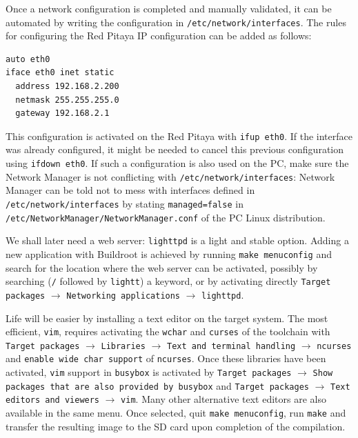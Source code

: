 \documentclass{article}
\begin{document}
{\color{red}Once a network configuration is completed and manually validated, it can be
automated by writing the configuration in {\tt /etc/network/interfaces}. The rules for
configuring the Red Pitaya IP configuration can be added as follows:
\begin{verbatim}
auto eth0
iface eth0 inet static
  address 192.168.2.200
  netmask 255.255.255.0
  gateway 192.168.2.1
\end{verbatim}

This configuration is activated on the Red Pitaya with {\tt ifup eth0}. If the interface
was already configured, it might be needed to cancel this previous configuration using
{\tt ifdown eth0}. If such a configuration is also used on the PC, make sure the Network Manager
is not conflicting with {\tt /etc/network/interfaces}: Network Manager can be told not to mess
with interfaces defined in {\tt /etc/network/interfaces} by stating {\tt managed=false} 
in \\ {\tt /etc/NetworkManager/NetworkManager.conf} of the PC Linux distribution.

%
%

\label{lighttpd}
We shall later need a web server: {\tt lighttpd} is a light and stable option.
Adding a new application with Buildroot is achieved by running
{\tt make menuconfig} and search for the location where the web server can be
activated, possibly by searching (\verb~/~ followed by {\tt lightt}) a keyword, 
or by activating directly {\tt Target packages} $\rightarrow$
{\tt Networking applications} $\rightarrow$ {\tt lighttpd}. 

Life will be easier by installing a text editor on the target system. The most
efficient, {\tt vim}, requires activating the {\tt wchar} and {\tt curses} of
the toolchain with %
{\tt Target packages} $\rightarrow$
{\tt Libraries} $\rightarrow$ {\tt Text and terminal handling} 
$\rightarrow$ {\tt ncurses} and {\tt enable wide char support} of {\tt ncurses}. Once these libraries have been activated,
{\tt vim} support in {\tt busybox} is activated by {\tt Target packages} $\rightarrow$ 
{\tt Show packages that are also provided by busybox} and {\tt Target packages} 
$\rightarrow$ {\tt Text editors and viewers} $\rightarrow$ {\tt vim}. Many other alternative
text editors are also available in the same menu. Once selected, quit {\tt make menuconfig},
run {\tt make} and transfer the resulting image to the SD card upon completion of the compilation.

}
\end{document}
